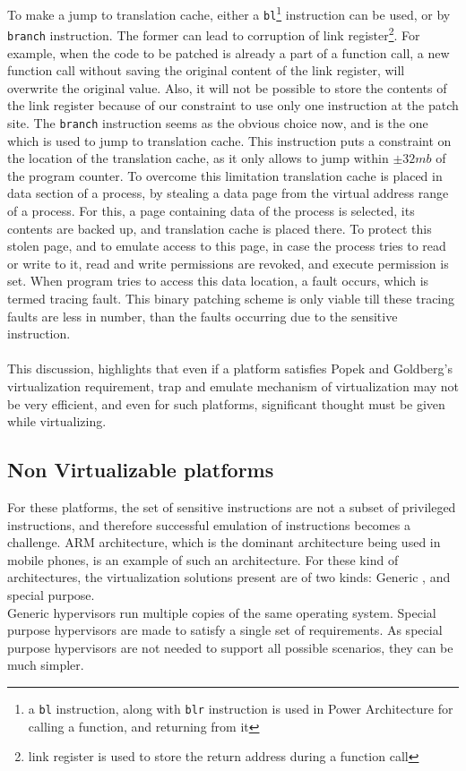 \documentclass[seminar,twoside]{iitbreport}
\begin{document}
  To make a jump to translation cache, either a \texttt{bl}\footnote{a \texttt{bl} instruction, along with \texttt{blr} instruction is used in Power Architecture for calling a function, and returning from it } instruction can be used, or by \texttt{branch}
  instruction. The former can lead to corruption of link register\footnote{link register is used to store the return address during a function call}. For example, when the code to be patched is already a part of a
  function call, a new function call without saving the original content of the link register, will overwrite the original value. Also, it
  will not be possible to store the contents of the link register because of our constraint to use only one instruction at the patch site.
  The \texttt{branch} instruction seems as the obvious choice now, and is the one which is used to jump to translation cache. This instruction puts a constraint on the location
  of the translation cache, as it only allows to jump within $\pm 32mb$ of the program counter.
  To overcome this limitation translation cache is placed in data section of a process, by stealing a data page from the virtual address range of a process. For this, a page containing data of the process is selected,
  its contents are backed up, and translation cache is placed there. To protect this stolen page, and to emulate access to this page, in case the process tries to read or write to
  it, read and write permissions are revoked, and execute permission is set.
  When program tries to access this data location, a fault occurs, which is termed tracing fault. This binary patching scheme is only viable till these tracing
  faults are less in number, than the faults occurring due to the sensitive instruction.
  \\\\
  This discussion, highlights that even if a platform satisfies Popek and Goldberg's virtualization requirement, trap and emulate mechanism of virtualization
  may not be very efficient, and even for such platforms, significant thought must be given while virtualizing.
  
  \subsection{Non Virtualizable platforms}
  For these platforms, the set of sensitive instructions are not a subset of privileged instructions, and therefore successful emulation of instructions
  becomes a challenge. ARM architecture, which is the dominant architecture being used in mobile phones, is an example of such an architecture.
  For these kind of architectures, the virtualization solutions present are of two kinds: Generic , and special purpose.
  \\
  Generic hypervisors run multiple copies of the same operating system. Special purpose hypervisors are made to satisfy a single set of requirements. As special
  purpose hypervisors are not needed to support all possible scenarios, they can be much simpler.
  
\end{document}
